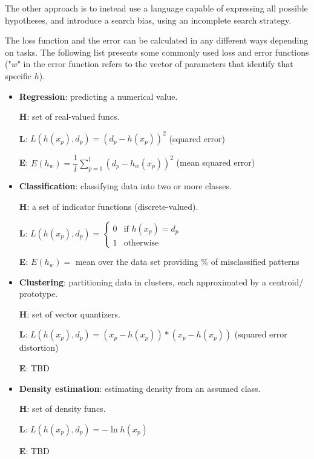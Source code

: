 The other approach is to instead use a language capable of expressing all possible hypotheses, and introduce a search bias, using an incomplete search strategy. 


The loss function and the error can be calculated in any different ways depending on tasks. The following list presents some commonly used loss and error functions ("$w$" in the error function refers to the vector of parameters that identify that specific $h$).

\begin{itemize}
    \item \textbf{Regression}: predicting a numerical value.
    
    \textbf{H}: set of real-valued funcs.
    
    \textbf{L}: $L(h(x_p),d_p) = (d_p - h(x_p))^2$ (squared error)
    
    \textbf{E}: $E(h_w) = \dfrac{1}{l} \sum_{p=1}^l (d_p - h_w(x_p))^2$ (mean squared error)

    \item \textbf{Classification}: classifying data into two or more classes.

    \textbf{H}: a set of indicator functions (discrete-valued).
    
    \textbf{L}: $L(h(x_p),d_p) = \begin{cases}
                                    0 & \text{if } h(x_p) = d_p \\
                                    1 & \text{otherwise}
                                \end{cases}$
                                    
    \textbf{E}: $E(h_w) = $ mean over the data set providing \% of misclassified patterns

    \item \textbf{Clustering}: partitioning data in clusters, each approximated by a centroid/ prototype.

    \textbf{H}: set of vector quantizers.
    
    \textbf{L}: $L(h(x_p), d_p) = (x_p - h(x_p)) * (x_p - h(x_p))$ (squared error distortion)

    \textbf{E}: TBD

    \item \textbf{Density estimation}: estimating density from an assumed class.

    \textbf{H}: set of density funcs.

    \textbf{L}: $L(h(x_p), d_p) = -\ln{h(x_p)}$

    \textbf{E}: TBD
\end{itemize}

